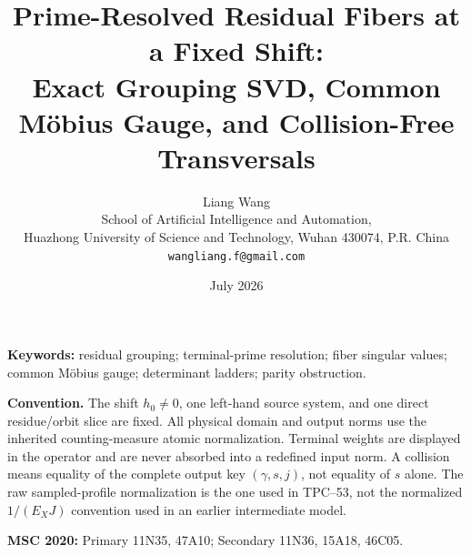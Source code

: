 \documentclass[11pt]{article}
\title{\bfseries Prime-Resolved Residual Fibers at a Fixed Shift:\\
Exact Grouping SVD, Common M\"obius Gauge, and Collision-Free Transversals}
\author{Liang Wang\\
\small School of Artificial Intelligence and Automation,\\[-2pt]
\small Huazhong University of Science and Technology, Wuhan 430074, P.R. China\\
\small \texttt{wangliang.f@gmail.com}}
\date{July 2026}
\theoremstyle{definition}
\theoremstyle{remark}
\begin{document}
\maketitle



\noindent\textbf{Keywords:} residual grouping; terminal-prime resolution;
fiber singular values; common M\"obius gauge; determinant ladders; parity
obstruction.

\medskip
\noindent\textbf{Convention.}
The shift \(h_0\ne0\), one left-hand source system, and one direct
residue/orbit slice are fixed.
All physical domain and output norms use the inherited counting-measure
atomic normalization.  Terminal weights are displayed in the operator and
are never absorbed into a redefined input norm.  A collision means equality
of the complete output key \((\gamma,s,j)\), not equality of \(s\) alone.
The raw sampled-profile normalization is the one used in TPC--53, not the
normalized \(1/(E_XJ)\) convention used in an earlier intermediate model.

\medskip
\noindent\textbf{MSC 2020:} Primary 11N35, 47A10; Secondary 11N36,
15A18, 46C05.









\begingroup
\small
\raggedright
\setlength{\bibsep}{4pt plus 1pt minus 1pt}


\endgroup
\end{document}
